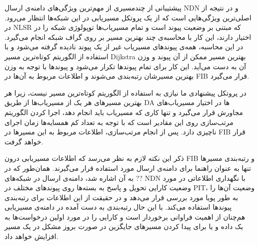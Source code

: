 \label{multipach}
پیشتیبانی از چندمسیری از مهم‌ترین ویژگی‌های دامنه‌ی ارسال NDN و در نتیجه از اصلی‌ترین ویژگی‌هایی است که از یک پروتکل مسیریابی در این شبکه‌ها انتظار می‌رود. در NLSR که مبتنی بر وضعیت پیوند است و تمام مسیریاب‌ها توپولوژی شبکه را در اختیار دارند، این کار با محاسبه‌ی چند بهترین مسیر بر روی گراف شبکه انجام می‌گیرد. در این محاسبه، همه‌ی پیوندهای مسیریاب غیر از یک پیوند نادیده گرفته می‌شود و با استفاده از الگوریتم کوتاه‌ترین مسیر Dijkstra بهترین مسیر ممکن از آن پیوند و وزن آن به دست می‌آید. این کار برای تمام پیوندها تکرار می‌شود و پیوندها با توجه به وزن بهترین مسیرشان رتبه‌بندی می‌شوند و اطلاعات مربوط به آن‌ها در FIB قرار می‌گیرد. 

در پروتکل پیشنهادی ما نیازی به استفاده از الگوریتم کوتاه‌ترین مسیر نیست، زیرا هر بهترین مسیرهای هر یک از مسیریاب‌ها از طریق DA ها در اختیار مسیریاب‌های مجاورش قرار می‌گیرد و تنها کاری که مسیریاب باید انجام دهد، اجرا کردن الگوریتم مرتب‌سازی روی این مقادیر است که با توجه به تعداد کم همسایه‌ها زمان اجرای ناچیزی دارد. پس از انجام مرتب‌سازی، اطلاعات مربوط به این مسیرها در FIB  قرار خواهد گرفت.

ذکر این نکته لازم به نظر می‌رسد که اطلاعات مسیریابی درون FIB و رتبه‌بندی مسیر‌ها تنها به عنوان راهنما برای دامنه‌ی ارسال مورد استفاده قرار می‌گیرند. همان‌طور که در ?? به آن اشاره شد، دامنه‌ی ارسال در شبکه‌های NDN با نگهداری اطلاعاتی در مورد وضعیت کارایی تحویل و پاسخ به بسته‌ها روی پیوند‌های مختلف در PIT، وضعیت آن‌ها را به طور پویا مورد بررسی قرار  می‌دهد و در حقیقت از این اطلاعات برای رتبه‌بندی پیوندها استفاده می‌کند. با این حال رتبه‌بندی به دست آمده در دامنه‌ی مسیریابی هم‌چنان از اهمیت فراوانی برخوردار است و کارایی را در مورد اولین درخواست‌ها به یک داده و یا برای پیدا کردن مسیرهای جایگزین در صورت بروز مشکل در یک مسیر افزایش خواهد داد.

\label{sync}

